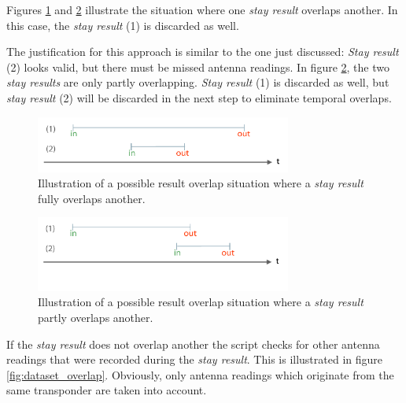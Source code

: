 Figures \ref{fig:result_overlap_single} and \ref{fig:result_overlap_single_shifted} illustrate the situation where one \textit{stay result} overlaps another. In this case, the \textit{stay result} (1) is discarded as well.

The justification for this approach is similar to the one just discussed: \textit{Stay result} (2) looks valid, but there must be missed antenna readings. In figure \ref{fig:result_overlap_single_shifted}, the two \textit{stay results} are only partly overlapping. \textit{Stay result} (1) is discarded as well, but \textit{stay result} (2) will be discarded in the next step to eliminate temporal overlaps.      

\begin{figure}[htpb]
\begin{center}
  \includegraphics[width=0.75\textwidth]{assets/pdf/result_overlaps_single_schema.pdf}
  \caption[Single result full overlap situation]{Illustration of a possible result overlap situation where a \textit{stay result} fully overlaps another.}
  \label{fig:result_overlap_single}
\end{center}
\end{figure} 

\begin{figure}[htpb]
\begin{center}
  \includegraphics[width=0.75\textwidth]{assets/pdf/result_overlaps_single_shifted_schema.pdf}
  \caption[Single result partly overlapped]{Illustration of a possible result overlap situation where a \textit{stay result} partly overlaps another.}
  \label{fig:result_overlap_single_shifted}
\end{center}
\end{figure}

If the \textit{stay result} does not overlap another the script checks for other antenna readings that were recorded during the \textit{stay result}. This is illustrated in figure \ref{fig:dataset_overlap}. Obviously, only antenna readings which originate from the same transponder are taken into account.

